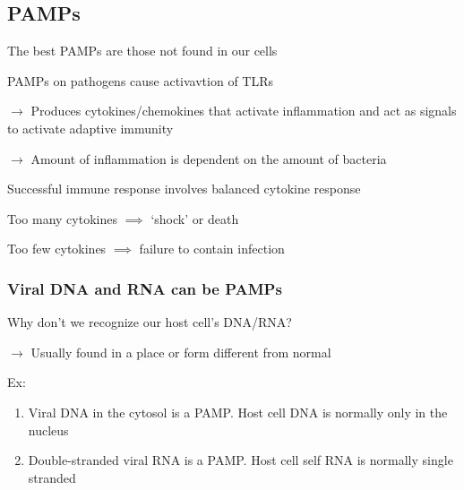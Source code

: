 \documentclass{notes}
\begin{document}
\subsection{PAMPs}
The best PAMPs are those not found in our cells

PAMPs on pathogens cause activavtion of TLRs

\hspace*{10px} \(\rightarrow\) Produces cytokines/chemokines that activate inflammation
and act as signals to activate adaptive immunity

\hspace*{10px} \(\rightarrow\) Amount of inflammation is dependent on the amount of bacteria

Successful immune response involves balanced cytokine response

Too many cytokines \(\implies\) `shock' or death

Too few cytokines \(\implies\) failure to contain infection

\subsubsection*{Viral DNA and RNA can be PAMPs}
 Why don't we recognize our host cell's DNA/RNA?

\hspace*{10px} \(\rightarrow\) Usually found in a place or form different from normal

Ex:
\begin{enumerate}
    \item Viral DNA in the cytosol is a PAMP. Host cell DNA is normally only in the nucleus
    \item Double-stranded viral RNA is a PAMP. Host cell self RNA is normally single stranded
\end{enumerate}
\end{document}

